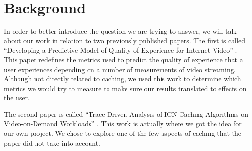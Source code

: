 \section{Background} \label{sec:background}
In order to better introduce the question we are trying to answer, we will talk
about our work in relation to two previously published papers. The first is
called ``Developing a Predictive Model of Quality of Experience for Internet
Video'' \cite{1}. This paper redefines the metrics used to predict the quality of
experience that a user experiences depending on a number of measurements of
video streaming. Although not directly related to caching, we used this work to
determine which metrics we would try to measure to make sure our results
translated to effects on the user.

The second paper is called ``Trace-Driven Analysis of ICN Caching Algorithms on
Video-on-Demand Workloads'' \cite{2}. This work is actually where we got the idea for
our own project. We chose to explore one of the few aspects of caching that the
paper did not take into account.
